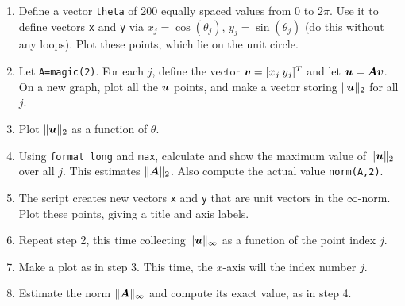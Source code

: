 \documentclass[11pt]{article}
\begin{document}
\begin{enumerate}
\item Define a vector \texttt{theta} of 200 equally spaced values from 0 to $2\pi$. Use it to define vectors \texttt{x} and \texttt{y} via $x_j = \cos(\theta_j)$, $y_j = \sin(\theta_j)$ (do this without any loops). Plot these points, which lie on the unit circle.

\item Let \texttt{A=magic(2)}. For each $j$, define the vector $\bm{v}=[x_j\:y_j]^T$ and let $\bm{u}=\bm{A}\bm{v}$. On a new graph, plot all the $\bm{u}$ points, and make a vector storing $\|\bm{u}\|_2$ for all $j$.

\item Plot $\|\bm{u}\|_2$ as a function of $\theta$. 

\item Using \texttt{format long} and \texttt{max}, calculate and show the maximum value of $\|\bm{u}\|_2$ over all $j$. This estimates $\|\bm{A}\|_2$. Also compute the actual value \texttt{norm(A,2)}.
  
\item The script creates new vectors \texttt{x} and \texttt{y} that are unit vectors in the $\infty$-norm. Plot these points, giving a title and axis labels.

\item Repeat step 2, this time collecting $\|\bm{u}\|_\infty$ as a function of the point index $j$.
  
\item Make a plot as in step 3. This time, the $x$-axis will the index number $j$.

\item Estimate the norm $\|\bm{A}\|_\infty$ and compute its exact value, as in step 4. 
\end{enumerate}
\end{document}

